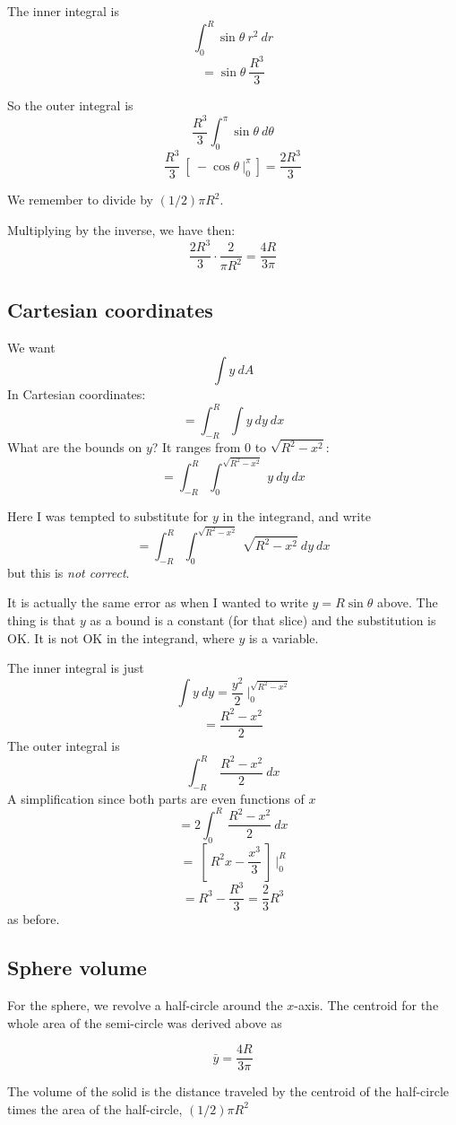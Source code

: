 \documentclass[11pt, oneside]{article}   	%
\begin{document}
The inner integral is
\[ \int_0^R \sin \theta \ r^2 \ dr \]
\[ = \sin \theta \ \frac{R^3}{3} \]

So the outer integral is
\[ \frac{R^3}{3} \int_0^{\pi} \sin \theta  \ d \theta \]
\[ \frac{R^3}{3} \ [ \ - \cos \theta \ \bigg |_0^{\pi} \ ] = \frac{2R^3}{3} \]

We remember to divide by $(1/2)\pi R^2$.

Multiplying by the inverse, we have then:
\[ \frac{2R^3}{3} \cdot \frac{2}{\pi R^2} = \frac{4R}{3 \pi} \]

\subsection*{Cartesian coordinates}

We want
\[ \int y \ dA \]
In Cartesian coordinates:
\[ = \int_{-R}^R \int y \ dy \ dx \]
What are the bounds on $y$?  It ranges from $0$ to $\sqrt{R^2 - x^2}$:
\[ = \int_{-R}^R \int_0^{\sqrt{R^2 - x^2}} \ y \ dy \ dx \]

Here I was tempted to substitute for $y$ in the integrand, and write
\[ = \int_{-R}^R \int_0^{\sqrt{R^2 - x^2}} \ \sqrt{R^2 - x^2} \ dy \ dx \]
but this is \emph{not correct}.

It is actually the same error as when I wanted to write $y = R \sin \theta$ above.  The thing is that $y$ as a bound is a constant (for that slice) and the substitution is OK.  It is not OK in the integrand, where $y$ is a variable.

The inner integral is just
\[ \int y \ dy = \frac{y^2}{2} \ \bigg |_0^{\sqrt{R^2 - x^2}} \]
\[ = \frac{R^2 - x^2}{2} \]
The outer integral is
\[ \int_{-R}^R \ \frac{R^2 - x^2}{2} \ dx \]
A simplification since both parts are even functions of $x$ 
\[ = 2 \int_0^R \ \frac{R^2 - x^2}{2} \ dx \]
\[ = \ [ \ R^2 x - \frac{x^3}{3} \ ] \ \bigg |_0^R \]
\[ = R^3 - \frac{R^3}{3} = \frac{2}{3}R^3 \]
as before.

\subsection*{Sphere volume}

For the sphere, we revolve a half-circle around the $x$-axis.  The centroid for the whole area of the semi-circle was derived above as

\[ \bar{y} = \frac{4 R}{3 \pi} \]

The volume of the solid is the distance traveled by the centroid of the half-circle times the area of the half-circle, $(1/2) \pi R^2$
\end{document}
